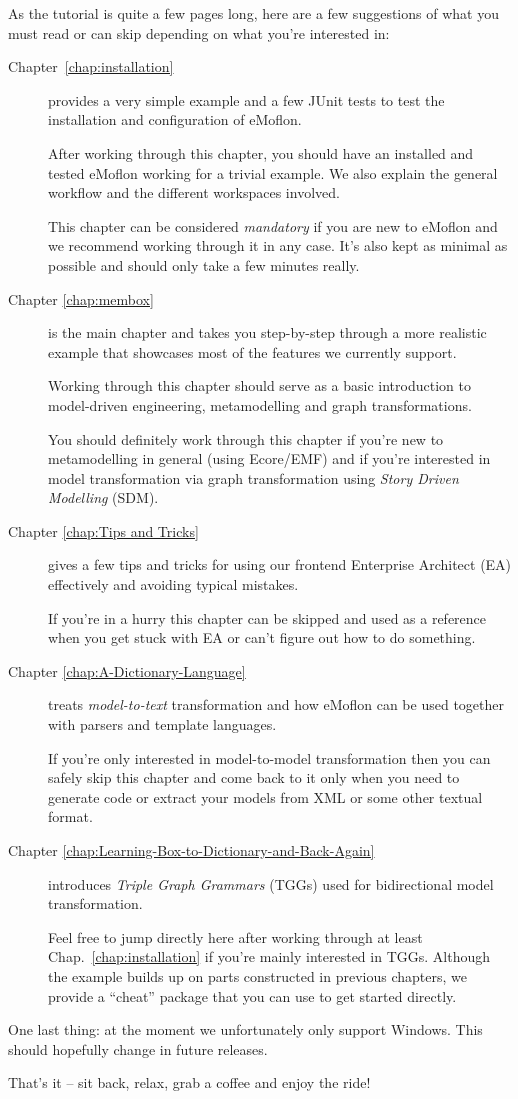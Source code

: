 As the tutorial is quite a few pages long, here are a few suggestions of what you must read or can skip depending on what you're interested in:

\begin{description}
\item[Chapter~\ref{chap:installation}] provides a very simple example and a few JUnit tests to test the installation and configuration of eMoflon.
 
After working through this chapter, you should have an installed and tested eMoflon working for a trivial example.
We also explain the general workflow and the different workspaces involved.

This chapter can be considered \emph{mandatory} if you are new to eMoflon and we recommend working through it in any case.
It's also kept as minimal as possible and should only take a few minutes really.

\item[Chapter \ref{chap:membox}] is the main chapter and takes you step-by-step through a more realistic example that showcases most of the features we currently support.

Working through this chapter should serve as a basic introduction to model-driven engineering, metamodelling and graph transformations.

You should definitely work through this chapter if you're new to metamodelling in general (using Ecore/EMF) and if you're interested in model transformation via graph transformation using \emph{Story Driven Modelling} (SDM).

\item[Chapter \ref{chap:Tips and Tricks}] gives a few tips and tricks for using our frontend Enterprise Architect (EA) effectively and avoiding typical mistakes.

If you're in a hurry this chapter can be skipped and used as a reference when you get stuck with EA or can't figure out how to do something.

\item[Chapter \ref{chap:A-Dictionary-Language}] treats \emph{model-to-text} transformation and how eMoflon can be used together with parsers and template languages.

If you're only interested in model-to-model transformation then you can safely skip this chapter and come back to it only when you need to generate code or extract your models from XML or some other textual format.
 
\item[Chapter \ref{chap:Learning-Box-to-Dictionary-and-Back-Again}] introduces \emph{Triple Graph Grammars} (TGGs) used for bidirectional model transformation.

Feel free to jump directly here after working through at least Chap.~\ref{chap:installation} if you're mainly interested in TGGs.
Although the example builds up on parts constructed in previous chapters, we provide a ``cheat'' package that you can use to get started directly.
 
\end{description}

One last thing: at the moment we unfortunately only support Windows. 
This should hopefully change in future releases.

That's it -- sit back, relax, grab a coffee and enjoy the ride!


